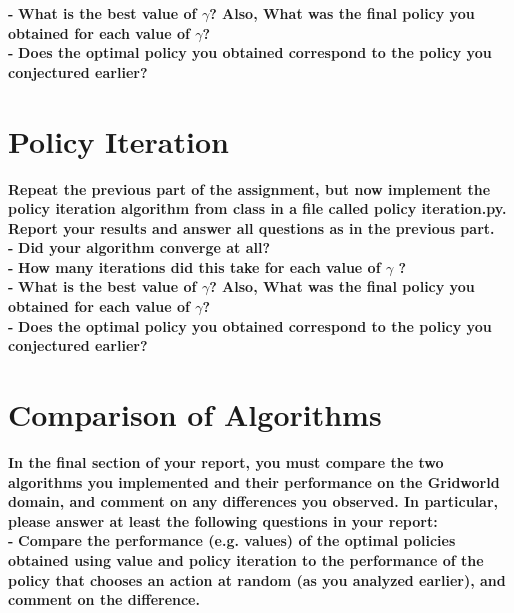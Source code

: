 \documentclass[11pt]{article}
\begin{document}
\noindent
\textbf{-}
\noindent
\textbf{What is the best value of $\gamma$? Also, What was the final policy you
obtained for each value of $\gamma$?}
\\

\noindent
\textbf{-}
\noindent
\textbf{Does the optimal policy you obtained correspond to the policy you
conjectured earlier?}
\\


\newpage
\section{Policy Iteration}
\textbf{Repeat the previous part of the assignment, but now implement the policy
iteration algorithm from class in a file called policy iteration.py. Report your
results and answer all questions as in the previous part.}
\\

\noindent
\textbf{-}
\noindent
\textbf{Did your algorithm converge at all?}
\\

\noindent
\textbf{-}
\noindent
\textbf{How many iterations did this take for each value of $\gamma$ ?}
\\

\noindent
\textbf{-}
\noindent
\textbf{What is the best value of $\gamma$? Also, What was the final policy you
obtained for each value of $\gamma$?}
\\

\noindent
\textbf{-}
\noindent
\textbf{Does the optimal policy you obtained correspond to the policy you
conjectured earlier?}
\\

\section{Comparison of Algorithms}
\textbf{In the final section of your report, you must compare the two algorithms you
implemented and their performance on the Gridworld domain, and comment on any
differences you observed. In particular, please answer at least the following
questions in your report:}
\\

\noindent
\textbf{-}
\noindent
\textbf{Compare the performance (e.g. values) of the optimal policies obtained
using value and policy iteration to the performance of the policy that chooses
an action at random (as you analyzed earlier), and comment on the difference.}
\\
\end{document}
